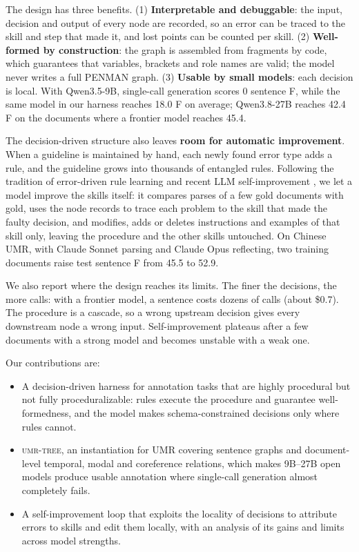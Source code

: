 \documentclass[11pt]{article}
\newcommand{\umr}{\textsc{UMR}\xspace}
\newcommand{\sys}{\textsc{umr-tree}\xspace}
\begin{document}
The design has three benefits. (1) \textbf{Interpretable and debuggable}: the input, decision and output of every node are recorded, so an error can be traced to the skill and step that made it, and lost points can be counted per skill. (2) \textbf{Well-formed by construction}: the graph is assembled from fragments by code, which guarantees that variables, brackets and role names are valid; the model never writes a full PENMAN graph. (3) \textbf{Usable by small models}: each decision is local. With Qwen3.5-9B, single-call generation scores 0 sentence F, while the same model in our harness reaches 18.0 F on average; Qwen3.8-27B reaches 42.4 F on the documents where a frontier model reaches 45.4.

The decision-driven structure also leaves \textbf{room for automatic improvement}. When a guideline is maintained by hand, each newly found error type adds a rule, and the guideline grows into thousands of entangled rules. Following the tradition of error-driven rule learning \citep{brill1995transformation} and recent LLM self-improvement \citep{madaan2023selfrefine,shinn2023reflexion,acl2026base}, we let a model improve the skills itself: it compares parses of a few gold documents with gold, uses the node records to trace each problem to the skill that made the faulty decision, and modifies, adds or deletes instructions and examples of that skill only, leaving the procedure and the other skills untouched. On Chinese \umr, with Claude Sonnet parsing and Claude Opus reflecting, two training documents raise test sentence F from 45.5 to 52.9.

We also report where the design reaches its limits. The finer the decisions, the more calls: with a frontier model, a sentence costs dozens of calls (about \$0.7). The procedure is a cascade, so a wrong upstream decision gives every downstream node a wrong input. Self-improvement plateaus after a few documents with a strong model and becomes unstable with a weak one.

Our contributions are:
\begin{itemize}[leftmargin=*,itemsep=1pt,topsep=2pt]
  \item A decision-driven harness for annotation tasks that are highly procedural but not fully proceduralizable: rules execute the procedure and guarantee well-formedness, and the model makes schema-constrained decisions only where rules cannot.
  \item \sys, an instantiation for \umr covering sentence graphs and document-level temporal, modal and coreference relations, which makes 9B--27B open models produce usable annotation where single-call generation almost completely fails.
  \item A self-improvement loop that exploits the locality of decisions to attribute errors to skills and edit them locally, with an analysis of its gains and limits across model strengths.
\end{itemize}
\end{document}
